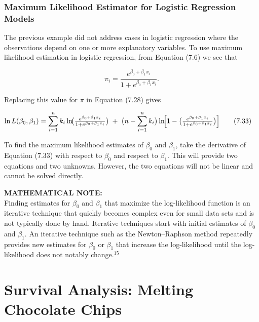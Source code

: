 \documentclass[
]{report}
\begin{document}
\subsection{Maximum Likelihood Estimator for Logistic Regression Models}\label{maximum-likelihood-estimator-for-logistic-regression-models}

The previous example did not address cases in logistic regression where the observations depend on one or more explanatory variables. To use maximum likelihood estimation in logistic regression, from Equation (7.6) we see that

\[
\pi_i = \frac{e^{\beta_0 + \beta_1 x_i}}{1 + e^{\beta_0 + \beta_1 x_i}}.
\]

Replacing this value for \(\pi\) in Equation (7.28) gives

\begin{align}
\ln L(\beta_0, \beta_1)
&= \sum_{i=1}^n k_i \ln\!\bigl(\tfrac{e^{\beta_0 + \beta_1 x_i}}{1 + e^{\beta_0 + \beta_1 x_i}}\bigr)
\;+\;\bigl(n - \sum_{i=1}^n k_i\bigr)\ln\!\Bigl[1 - \bigl(\tfrac{e^{\beta_0 + \beta_1 x_i}}{1 + e^{\beta_0 + \beta_1 x_i}}\bigr)\Bigr]
\tag{7.33}
\end{align}

To find the maximum likelihood estimates of \(\beta_0\) and \(\beta_1\), take the derivative of Equation (7.33) with respect to \(\beta_0\) and respect to \(\beta_1\). This will provide two equations and two unknowns. However, the two equations will not be linear and cannot be solved directly.

\large

\textbf{MATHEMATICAL NOTE:}\\
Finding estimates for \(\beta_0\) and \(\beta_1\) that maximize the log-likelihood function is an iterative technique that quickly becomes complex even for small data sets and is not typically done by hand. Iterative techniques start with initial estimates of \(\beta_0\) and \(\beta_1\). An iterative technique such as the Newton--Raphson method repeatedly provides new estimates for \(\beta_0\) or \(\beta_1\) that increase the log-likelihood until the log-likelihood does not notably change.\(^{15}\)\\
\normalsize

\chapter{Survival Analysis: Melting Chocolate Chips}\label{survival-analysis-melting-chocolate-chips}
\end{document}
